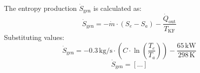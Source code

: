 The entropy production \( \dot{S}_{\text{gen}} \) is calculated as:  
\[
\dot{S}_{\text{gen}} = -\dot{m} \cdot (S_e - S_a) - \frac{\dot{Q}_{\text{out}}}{T_{\text{KF}}}
\]  
Substituting values:  
\[
\dot{S}_{\text{gen}} = -0.3 \, \text{kg/s} \cdot (C \cdot \ln \left( \frac{T_e}{T_a} \right)) - \frac{65 \, \text{kW}}{298 \, \text{K}}
\]  
\[
\dot{S}_{\text{gen}} = [\ldots]
\]